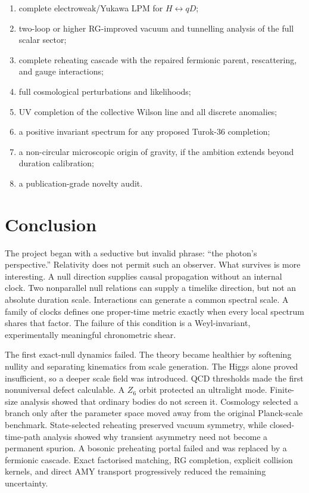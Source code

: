 \documentclass[
]{article}
\providecommand{\tightlist}{%
  \setlength{\itemsep}{0pt}\setlength{\parskip}{0pt}}
\begin{document}
\begin{enumerate}
\def\labelenumi{\arabic{enumi}.}
\tightlist
\item
  complete electroweak/Yukawa LPM for \(H\leftrightarrow qD\);
\item
  two-loop or higher RG-improved vacuum and tunnelling analysis of the
  full scalar sector;
\item
  complete reheating cascade with the repaired fermionic parent,
  rescattering, and gauge interactions;
\item
  full cosmological perturbations and likelihoods;
\item
  UV completion of the collective Wilson line and all discrete
  anomalies;
\item
  a positive invariant spectrum for any proposed Turok-36 completion;
\item
  a non-circular microscopic origin of gravity, if the ambition extends
  beyond duration calibration;
\item
  a publication-grade novelty audit.
\end{enumerate}

\section{Conclusion}\label{conclusion}

The project began with a seductive but invalid phrase: ``the photon's
perspective.'' Relativity does not permit such an observer. What
survives is more interesting. A null direction supplies causal
propagation without an internal clock. Two nonparallel null relations
can supply a timelike direction, but not an absolute duration scale.
Interactions can generate a common spectral scale. A family of clocks
defines one proper-time metric exactly when every local spectrum shares
that factor. The failure of this condition is a Weyl-invariant,
experimentally meaningful chronometric shear.

The first exact-null dynamics failed. The theory became healthier by
softening nullity and separating kinematics from scale generation. The
Higgs alone proved insufficient, so a deeper scale field was introduced.
QCD thresholds made the first nonuniversal defect calculable. A \(Z_6\)
orbit protected an ultralight mode. Finite-size analysis showed that
ordinary bodies do not screen it. Cosmology selected a branch only after
the parameter space moved away from the original Planck-scale benchmark.
State-selected reheating preserved vacuum symmetry, while
closed-time-path analysis showed why transient asymmetry need not become
a permanent spurion. A bosonic preheating portal failed and was replaced
by a fermionic cascade. Exact factorised matching, RG completion,
explicit collision kernels, and direct AMY transport progressively
reduced the remaining uncertainty.
\end{document}

